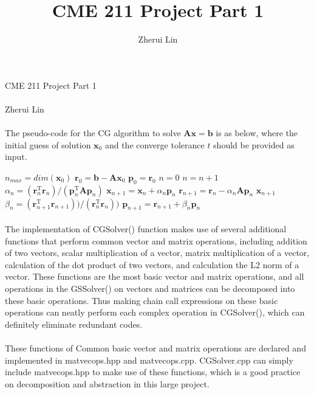 \documentclass[12pt,letterpaper]{article}
\title{CME 211 Project Part 1}
\author{Zherui Lin}
\begin{document}
\paragraph{} CME 211 Project Part 1
\paragraph{} Zherui Lin
\paragraph{} The pseudo-code for the CG algorithm to solve $\mathbf{Ax} = \mathbf{b}$ is as below, where the initial guess of solution $\mathbf{x}_0$ and the converge tolerance $t$ should be provided as input.
\linebreak
\begin{algorithmic}
\State $n_{max} = dim(\mathbf{x}_0)$
\State $\mathbf{r}_0 = \mathbf{b} - \mathbf{A}\mathbf{x}_0$
\State $\mathbf{p}_0 = \mathbf{r}_0$
\State $n = 0$
    \State $n = n + 1$
    \State $\alpha_n = (\mathbf{r}_n^\mathrm{T}\mathbf{r}_n) / (\mathbf{p}_n^\mathrm{T}\mathbf{A}\mathbf{p}_n)$
    \State $\mathbf{x}_{n+1} = \mathbf{x}_n + \alpha_n\mathbf{p}_n$
    \State $\mathbf{r}_{n+1} = \mathbf{r}_n - \alpha_n\mathbf{A}\mathbf{p}_n$
        \State \Return $\mathbf{x}_{n+1}$
    \EndIf
    \State $\beta_n = (\mathbf{r}_{n+1}^\mathrm{T}\mathbf{r}_{n+1})) / (\mathbf{r}_n^\mathrm{T}\mathbf{r}_n))$
    \State $\mathbf{p}_{n+1} = \mathbf{r}_{n+1} + \beta_n\mathbf{p}_n$
\EndWhile
\EndFunction
\end{algorithmic}
\paragraph{} The implementation of CGSolver() function makes use of several additional functions that perform common vector and matrix operations, including addition of two vectors, scalar multiplication of a vector, matrix multiplication of a vector, calculation of the dot product of two vectors, and calculation the L2 norm of a vector. These functions are the most basic vector and matrix operations, and all operations in the GSSolver() on vectors and matrices can be decomposed into these basic operations. Thus making chain call expressions on these basic operations can neatly perform each complex operation in CGSolver(), which can definitely eliminate redundant codes.
\paragraph{} These functions of Common basic vector and matrix operations are declared and implemented in matvecops.hpp and matvecops.cpp. CGSolver.cpp can simply include matvecops.hpp to make use of these functions, which is a good practice on decomposition and abstraction in this large project.
\end{document}
